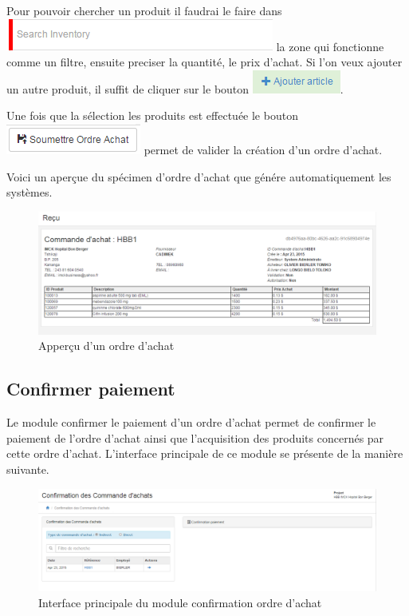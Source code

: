 \documentclass[12pt,a4paper]{report}
\begin{document}
Pour pouvoir chercher un produit il faudrai le faire dans \includegraphics[scale=0.4]{pic/SearchInventory.png} la zone qui fonctionne comme un filtre, ensuite preciser la quantité, le prix d'achat. Si l'on veux ajouter un autre produit, il suffit de cliquer sur le bouton \includegraphics[scale=0.7]{pic/AjArticleGreen.png}.

Une fois que la sélection les produits est effectuée le bouton \includegraphics[scale=0.7]{pic/SunPurchaseOrder.png} permet de valider la création d'un ordre d'achat.

Voici un aperçue du spécimen d'ordre d'achat que génére automatiquement les systèmes.

\begin{figure}[h]
\begin{center}
\includegraphics[width=12cm]{pic/OrdreAchatInvoice.png}
\end{center}
\caption{Apperçu d'un ordre d'achat}
\label{Apperçu d'un ordre d'achat}
\end{figure}  

\newpage
\subsection{Confirmer paiement}
Le module confirmer le paiement d'un ordre d'achat permet de confirmer le paiement de l'ordre d'achat ainsi que l'acquisition des produits concernés par cette ordre d'achat. L'interface principale de ce module se présente de la manière suivante.

\begin{figure}[h]
\begin{center}
\includegraphics[width=12cm]{pic/ConfPaieAchat.png}
\end{center}
\caption{Interface principale du module confirmation ordre d'achat}
\label{Interface principale du module confirmation ordre d'achat}
\end{figure}  
\end{document}
